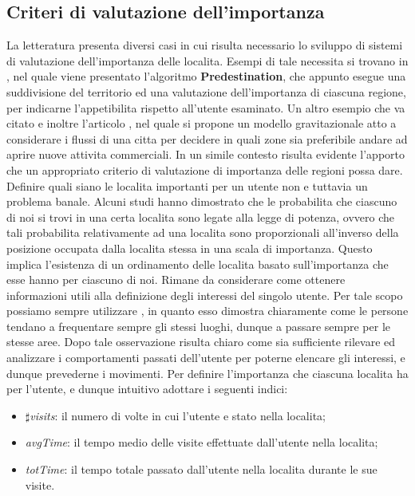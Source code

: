 \subsection{Criteri di valutazione dell'importanza}
La letteratura presenta diversi casi in cui risulta necessario lo sviluppo di sistemi
di valutazione dell'importanza delle localita.
Esempi di tale necessita si trovano in \cite{cit_42}, nel quale viene presentato l'algoritmo
\textbf{Predestination}, che appunto esegue una suddivisione del territorio ed una
valutazione dell'importanza di ciascuna regione, per indicarne l'appetibilita
rispetto all'utente esaminato. Un altro esempio che va citato e inoltre l'articolo
\cite{cit_43}, nel quale si propone un modello gravitazionale atto a considerare i
flussi di una citta per decidere in quali zone sia preferibile andare ad aprire
nuove attivita commerciali. In un simile contesto risulta evidente l'apporto che
un appropriato criterio di valutazione di importanza delle regioni possa dare.
Definire quali siano le localita importanti per un utente non e tuttavia un
problema banale. Alcuni studi \cite{cit_44} hanno dimostrato che le probabilita che
ciascuno di noi si trovi in una certa localita sono legate alla legge di potenza,
ovvero che tali probabilita relativamente ad una localita sono proporzionali
all'inverso della posizione occupata dalla localita stessa in una scala di importanza.
Questo implica l'esistenza di un ordinamento delle localita basato sull'importanza
che esse hanno per ciascuno di noi. Rimane da considerare come
ottenere informazioni utili alla definizione degli interessi del singolo utente. Per
tale scopo possiamo sempre utilizzare \cite{cit_44}, in quanto esso dimostra chiaramente
come le persone tendano a frequentare sempre gli stessi luoghi, dunque
a passare sempre per le stesse aree. Dopo tale osservazione risulta chiaro come
sia sufficiente rilevare ed analizzare i comportamenti passati dell'utente per
poterne elencare gli interessi, e dunque prevederne i movimenti.
Per definire l'importanza che ciascuna localita ha per l'utente, e dunque
intuitivo adottare i seguenti indici:
\begin{itemize}
\item $\sharp$\textit{visits}: il numero di volte in cui l'utente e stato nella localita;
\item \textit{avgTime}: il tempo medio delle visite effettuate dall'utente nella localita;
\item \textit{totTime}: il tempo totale passato dall'utente nella localita durante le sue visite.
\end{itemize}
